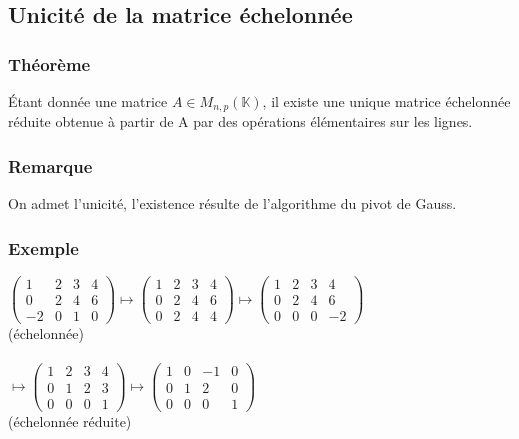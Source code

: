 \documentclass[a4paper,10pt]{book} %
\newcommand{\K}{\mathbb{K}}
\begin{document}
\subsection{Unicité de la matrice échelonnée}
\subsubsection{Théorème}
Étant donnée une matrice $A\in M_{n,p}(\K)$, il existe une unique matrice échelonnée réduite obtenue à partir de A par des opérations élémentaires sur les lignes.

\subsubsection{Remarque}
On admet l'unicité, l'existence résulte de l'algorithme du pivot de Gauss.

\subsubsection{Exemple}
$\begin{pmatrix}
1 & 2 & 3 & 4\\
0 & 2 & 4 & 6\\
-2 & 0 & 1 & 0
\end{pmatrix}\mapsto
\begin{pmatrix} 1 & 2 & 3 & 4 \\
0 & 2 & 4 & 6 \\
0 & 2 & 4 & 4 \end{pmatrix}
\mapsto \begin{pmatrix}
1 & 2 & 3 & 4 \\
0 & 2 & 4 & 6 \\
0 & 0 & 0 & -2
\end{pmatrix}$ \\ \hspace*{7cm}(échelonnée) \\\\
\hspace*{3.15cm} $\mapsto \begin{pmatrix}
1 & 2 & 3 & 4\\
0 & 1 & 2 & 3\\
0 & 0 & 0 & 1
\end{pmatrix} \mapsto \begin{pmatrix}
1 & 0 & -1 & 0 \\
0 & 1 & 2 & 0 \\
0 & 0 & 0 & 1
\end{pmatrix}$\\
\hspace*{6.3cm} (échelonnée réduite)
\end{document}
